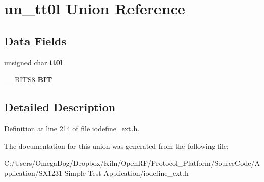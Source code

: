 \hypertarget{unionun__tt0l}{\section{un\-\_\-tt0l Union Reference}
\label{unionun__tt0l}
}
\subsection*{Data Fields}
\begin{DoxyCompactItemize}
\item 
\hypertarget{unionun__tt0l_a2ae304d2458b80ffca65be28a98b4aac}{unsigned char {\bfseries tt0l}}\label{unionun__tt0l_a2ae304d2458b80ffca65be28a98b4aac}

\item 
\hypertarget{unionun__tt0l_ae1c03cd1343435297faa20d49f4c5f68}{\hyperlink{struct_____b_i_t_s8}{\-\_\-\-\_\-\-B\-I\-T\-S8} {\bfseries B\-I\-T}}\label{unionun__tt0l_ae1c03cd1343435297faa20d49f4c5f68}

\end{DoxyCompactItemize}


\subsection{Detailed Description}


Definition at line 214 of file iodefine\-\_\-ext.\-h.



The documentation for this union was generated from the following file\-:\begin{DoxyCompactItemize}
\item 
C\-:/\-Users/\-Omega\-Dog/\-Dropbox/\-Kiln/\-Open\-R\-F/\-Protocol\-\_\-\-Platform/\-Source\-Code/\-Application/\-S\-X1231 Simple Test Application/iodefine\-\_\-ext.\-h\end{DoxyCompactItemize}
